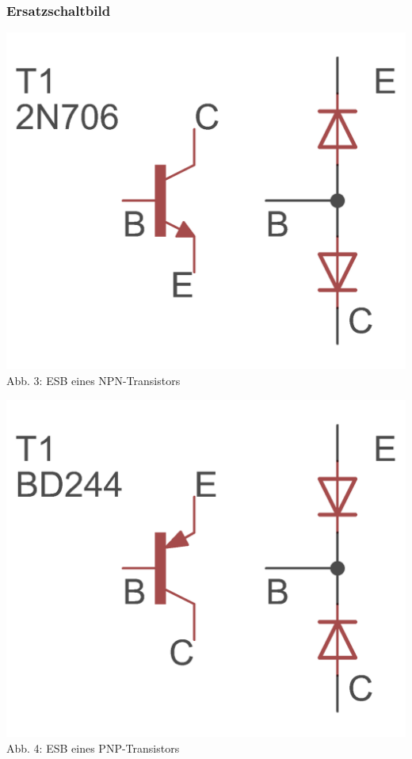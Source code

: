 \begin{frame}
\frametitle{Ersatzschaltbild}

\begin{minipage}{0.4\textwidth}
	\includegraphics[scale=1.4]{e13/NPN_esb.png}\\
	Abb. 3: ESB eines NPN-Transistors
\end{minipage}
\hspace{0.5cm}
\begin{minipage}{0.4\textwidth}
	\includegraphics[scale=1.4]{e13/PNP_esb.png}\\
	Abb. 4: ESB eines PNP-Transistors
\end{minipage}

\end{frame}


